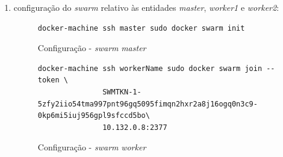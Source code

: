 \documentclass[a4paper]{report}
\begin{document}
{\begin{enumerate}[label=\textbf{\arabic*.}]
                \begin{figure}[H]
                    \centering
                    \begin{verbatim}
docker-machine create \
               --driver google --google-project ferrous-aleph-271712 \
               --google-zone europe-west1-b \
               --google-machine-type n1-standard-4 \
               --google-disk-size=100 \
               --google-disk-type=pd-ssd \
               --google-machine-image \
       https://www.googleapis.com/compute/v1/projects/centos-cloud/global/images/centos-7-v20200309 \
               workerName
                    \end{verbatim}
                    \vspace{-5mm}
                    \caption{Configuração - Criação de uma instância \textsl{worker}}
                    \label{fig:2}
                \end{figure}

                De salientar que a designação \texttt{ferrous-aleph-271712} corresponde ao identificador do projeto presente na plataforma \textit{Google Cloud} de um dos elementos que compõem este grupo.
                Assim, esta denominação deve ser substituída pelo nome do projeto do utilizador. Relativamente à designação \textit{workerName}, esta deve ser subtituída pelos nomes das entidades \textit{worker} referidas no ponto acima (\textsl{worker1} e \textsl{worker2}).

                \item configuração do \textit{swarm} relativo às entidades \textsl{master}, \textsl{worker1} e \textsl{worker2}:
                \begin{figure}[H]
                    \centering
                    \begin{verbatim}
docker-machine ssh master sudo docker swarm init
                    \end{verbatim}
                    \vspace{-5mm}
                    \caption{Configuração - \textit{swarm} \textsl{master}}
                    \label{fig:4}
                \end{figure}

                \begin{figure}[H]
                    \centering
                    \begin{verbatim}
docker-machine ssh workerName sudo docker swarm join --token \
               SWMTKN-1-5zfy2iio54tma997pnt96gq5095fimqn2hxr2a8j16ogq0n3c9-0kp6mi5iuj956gpl9sfccd5bo\
               10.132.0.8:2377
                    \end{verbatim}
                    \vspace{-5mm}
                    \caption{Configuração - \textit{swarm} \textsl{worker}}
                    \label{fig:5}
                \end{figure}


\end{enumerate}}
\end{document}
